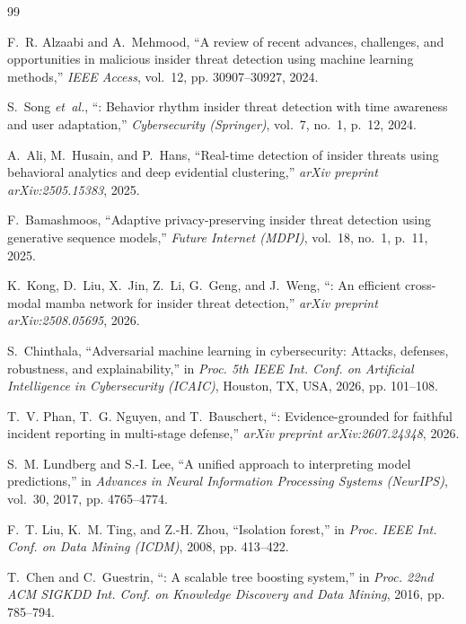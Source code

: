 \documentclass[12pt,a4paper]{report}
\begin{document}
\begin{thebibliography}{99}

F.~R. Alzaabi and A.~Mehmood, ``A review of recent advances, challenges, and opportunities in malicious insider threat detection using machine learning methods,'' \emph{IEEE Access}, vol.~12, pp. 30907--30927, 2024.

S.~Song \emph{et~al.}, ``: Behavior rhythm insider threat detection with time awareness and user adaptation,'' \emph{Cybersecurity (Springer)}, vol.~7, no.~1, p.~12, 2024.

A.~Ali, M.~Husain, and P.~Hans, ``Real-time detection of insider threats using behavioral analytics and deep evidential clustering,'' \emph{arXiv preprint arXiv:2505.15383}, 2025.

F.~Bamashmoos, ``Adaptive privacy-preserving insider threat detection using generative sequence models,'' \emph{Future Internet (MDPI)}, vol.~18, no.~1, p.~11, 2025.

K.~Kong, D.~Liu, X.~Jin, Z.~Li, G.~Geng, and J.~Weng, ``: An efficient cross-modal mamba network for insider threat detection,'' \emph{arXiv preprint arXiv:2508.05695}, 2026.

S.~Chinthala, ``Adversarial machine learning in cybersecurity: Attacks, defenses, robustness, and explainability,'' in \emph{Proc. 5th IEEE Int. Conf. on Artificial Intelligence in Cybersecurity (ICAIC)}, Houston, TX, USA, 2026, pp. 101--108.

T.~V. Phan, T.~G. Nguyen, and T.~Bauschert, ``: Evidence-grounded  for faithful incident reporting in multi-stage  defense,'' \emph{arXiv preprint arXiv:2607.24348}, 2026.

S.~M. Lundberg and S.-I. Lee, ``A unified approach to interpreting model predictions,'' in \emph{Advances in Neural Information Processing Systems (NeurIPS)}, vol.~30, 2017, pp. 4765--4774.

F.~T. Liu, K.~M. Ting, and Z.-H. Zhou, ``Isolation forest,'' in \emph{Proc. IEEE Int. Conf. on Data Mining (ICDM)}, 2008, pp. 413--422.

T.~Chen and C.~Guestrin, ``: A scalable tree boosting system,'' in \emph{Proc. 22nd ACM SIGKDD Int. Conf. on Knowledge Discovery and Data Mining}, 2016, pp. 785--794.


\end{thebibliography}
\end{document}
